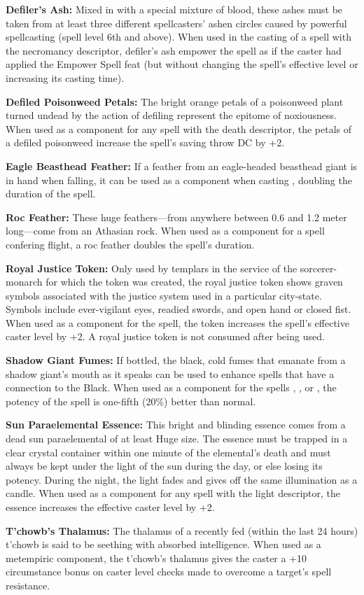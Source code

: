 \textbf{Defiler's Ash:} Mixed in with a special mixture of blood, these ashes must be taken from at least three different spellcasters' ashen circles caused by powerful spellcasting (spell level 6th and above). When used in the casting of a spell with the necromancy descriptor, defiler's ash empower the spell as if the caster had applied the Empower Spell feat (but without changing the spell's effective level or increasing its casting time).

\textbf{Defiled Poisonweed Petals:} The bright orange petals of a poisonweed plant turned undead by the action of defiling represent the epitome of noxiousness. When used as a component for any spell with the death descriptor, the petals of a defiled poisonweed increase the spell's saving throw DC by +2.

\textbf{Eagle Beasthead Feather:} If a feather from an eagle-headed beasthead giant is in hand when falling, it can be used as a component when casting , doubling the duration of the spell.

\textbf{Roc Feather:} These huge feathers---from anywhere between 0.6 and 1.2 meter long---come from an Athasian rock. When used as a component for a spell confering flight, a roc feather doubles the spell's duration.

\textbf{Royal Justice Token:} Only used by templars in the service of the sorcerer-monarch for which the token was created, the royal justice token shows graven symbols associated with the justice system used in a particular city-state. Symbols include ever-vigilant eyes, readied swords, and open hand or closed fist. When used as a component for the  spell, the token increases the spell's effective caster level by +2. A royal justice token is not consumed after being used.

\textbf{Shadow Giant Fumes:} If bottled, the black, cold fumes that emanate from a shadow giant's mouth as it speaks can be used to enhance spells that have a connection to the Black. When used as a component for the spells , , or , the potency of the spell is one-fifth (20\%) better than normal.

\textbf{Sun Paraelemental Essence:} This bright and blinding essence comes from a dead sun paraelemental of at least Huge size. The essence must be trapped in a clear crystal container within one minute of the elemental's death and must always be kept under the light of the sun during the day, or else losing its potency. During the night, the light fades and gives off the same illumination as a candle. When used as a component for any spell with the light descriptor, the essence increases the effective caster level by +2.

\textbf{T'chowb's Thalamus:} The thalamus of a recently fed (within the last 24 hours) t'chowb is said to be seething with absorbed intelligence. When used as a metempiric component, the t'chowb's thalamus gives the caster a +10 circumstance bonus on caster level checks made to overcome a target's spell resistance.